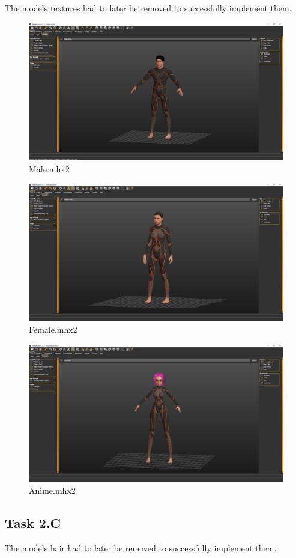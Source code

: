 \documentclass{article}
\begin{document}
\begin{info} %
	The models textures had to later be removed to successfully implement them.
\end{info}

\begin{figure}[h!]
	\centering
	\includegraphics[width=0.6 \linewidth]{Male.png}
	\caption{Male.mhx2}
\end{figure}

\begin{figure}[h!]
	\centering
	\includegraphics[width=0.6 \linewidth]{Female.png}
	\caption{Female.mhx2}
\end{figure}

\begin{figure}[h!]
	\centering
	\includegraphics[width=0.6 \linewidth]{Anime.png}
	\caption{Anime.mhx2}
\end{figure}

\newpage
\subsection{Task 2.C}\label{sec:2C}


\begin{info} %
	The models hair had to later be removed to successfully implement them.
\end{info}
\end{document}
